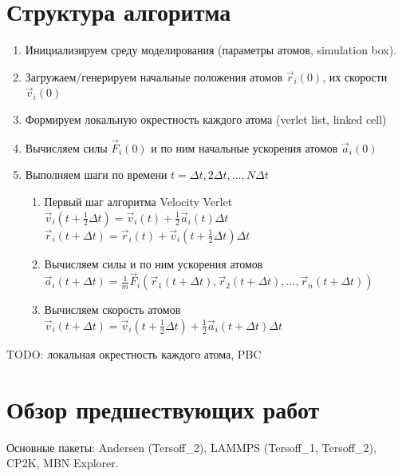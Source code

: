 \documentclass[a4paper, 12pt]{article}
\begin{document}
\section{Структура алгоритма}

\begin{enumerate}
\item Инициализируем среду моделирования (параметры атомов, simulation box).
\item Загружаем/генерируем начальные положения атомов $\vec{r}_i(0)$, их скорости $\vec{v}_i(0)$
\item Формируем локальную окрестность каждого атома (verlet list, linked cell)
\item Вычисляем силы $\vec{F}_i(0)$ и по ним начальные ускорения атомов $\vec{a}_i(0)$
\item Выполняем шаги по времени $t = \Delta t, 2\Delta t, \ldots, N\Delta t$
    \begin{enumerate}
    \item Первый шаг алгоритма Velocity Verlet\\
    $\vec{v}_i(t + \frac{1}{2}\Delta t) = \vec{v}_i(t) +  \frac{1}{2}\vec{a}_i(t) \Delta t$\\
    $\vec{r}_i(t + \Delta t) = \vec{r}_i(t) +  \vec{v}_i(t + \frac{1}{2}\Delta t) \Delta t$ 
    \item Вычисляем силы и по ним ускорения атомов \\$\vec{a}_i(t + \Delta t) = \frac{1}{m} \vec{F}_i(\vec{r}_1(t + \Delta t), \vec{r}_2(t + \Delta t), \ldots, \vec{r}_n(t + \Delta t))$
    \item Вычисляем скорость атомов \\$\vec{v}_i(t + \Delta t) = \vec{v}_i(t + \frac{1}{2}\Delta t) +  \frac{1}{2}  \vec{a}_i(t + \Delta t) \Delta t$
    \end{enumerate}
 
\end{enumerate}

TODO: локальная окрестность каждого атома, PBC

\section{Обзор предшествующих работ}

Основные пакеты: Andersen (Tersoff\_2), LAMMPS (Tersoff\_1, Tersoff\_2), CP2K, MBN Explorer.




\end{document}
